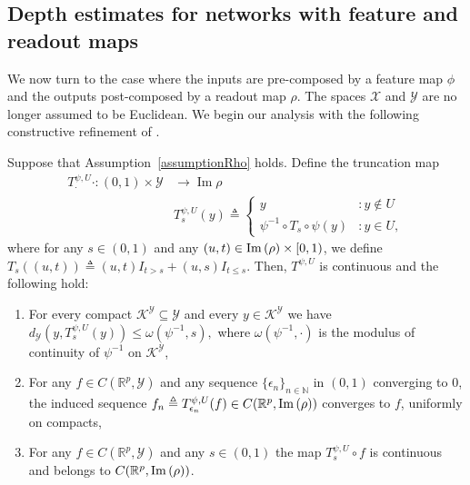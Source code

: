 \documentclass[anon,12pt]{colt2021} %
\newcommand{\xxx}{\mathcal{X}}
\newcommand{\yyy}{\mathcal{Y}}
\newcommand{\nn}{{\mathbb{N}}}
\newcommand{\kkk}{{\mathscr{K}}}
\begin{document}
\subsection{Depth estimates for networks with feature and readout maps}

We now turn to the case where the inputs are pre-composed by a feature map $\phi$ and the outputs post-composed by a readout map $\rho$.  The spaces $\xxx$ and $\yyy$ are no longer assumed to be Euclidean.  We begin our analysis with the following constructive refinement of \citep[Lemma B.4]{kratsios2020non}.  
\begin{lemma}\label{lem_constructive_variant_LB4}
Suppose that Assumption~\ref{assumptionRho} holds.  Define the truncation map
$$
\begin{aligned}
T^{\psi,U}_{\cdot}{\cdot}: (0,1)\times \yyy & \rightarrow \operatorname{Im}{\rho}\\
& T_{s}^{\psi,U}(y)\triangleq 
\begin{cases}
y
& : y \not\in U\\
\psi^{-1}\circ T_{s}\circ \psi(y) & : y \in U
,
\end{cases}
\end{aligned}
$$
where for any $s \in (0,1)$ and any $(u,t)\in \operatorname{Im}\left({\rho}\right)\times [0,1)$, we define $T_s((u,t))\triangleq (u,t)I_{t>s} + (u,s)I_{t\leq s}$.  Then, $T^{\psi,U}$ is continuous and the following hold:
\begin{enumerate}[label=(i),leftmargin=1.75em]
    \item For every compact $\kkk^{\yyy}\subseteq \yyy$ and every $y \in \kkk^{\yyy}$ we have
    $
    d_{\yyy}\left(
    y,T_s^{\psi,U}(y)
    \right) \leq 
   \omega\left(
   \psi^{-1},
   s
   \right)
    ,
    $
    where $\omega(\psi^{-1},\cdot)$ is the modulus of continuity of $\psi^{-1}$ on $\kkk^{\yyy}$,
    \item For any $f \in C(\mathbb{R}^{p},\yyy)$ and any sequence $\{\epsilon_n\}_{n \in \nn}$ in $(0,1)$ converging to $0$, the induced sequence $f_n\triangleq T^{\psi,U}_{\epsilon_n}(f) \in C(\mathbb{R}^{p},\operatorname{Im}\left({\rho}\right))$ converges to $f$, uniformly on compacts,
    \item For any $f \in C(\mathbb{R}^{p},\yyy)$ and any $s \in (0,1)$ the map $T_s^{\psi,U}\circ f$ is continuous and belongs to $C(\mathbb{R}^{p},\operatorname{Im}\left({\rho}\right))$.  
\end{enumerate}
\end{lemma}
\end{document}
